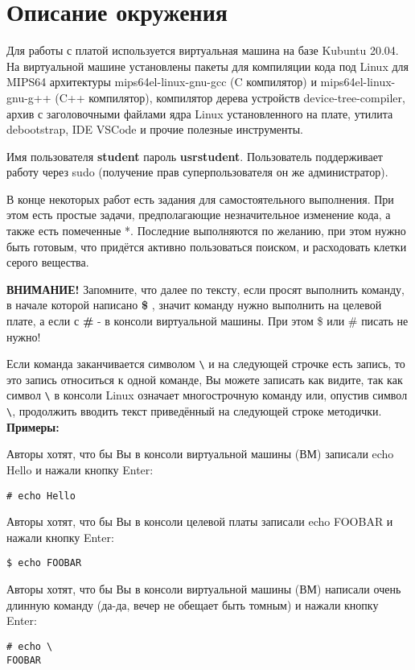 \section*{Описание окружения}
Для работы с платой используется виртуальная машина на базе Kubuntu 20.04. На виртуальной машине установлены пакеты для компиляции кода под Linux для MIPS64 архитектуры mips64el-linux-gnu-gcc (C компилятор) и mips64el-linux-gnu-g++ (C++ компилятор), компилятор дерева устройств device-tree-compiler, архив с заголовочными файлами ядра Linux установленного на плате, утилита debootstrap, IDE VSCode и прочие полезные инструменты. 

Имя пользователя \textbf{student} пароль \textbf{usrstudent}. Пользователь поддерживает работу через sudo (получение прав суперпользователя он же администратор).

В конце некоторых работ есть задания для самостоятельного выполнения. При этом есть простые задачи, предполагающие незначительное изменение кода, а также есть помеченные *. Последние выполняются по желанию, при этом нужно быть готовым, что придётся активно пользоваться поиском, и расходовать клетки серого вещества.

\textbf{ВНИМАНИЕ!} Запомните, что далее по тексту, если просят выполнить команду, в начале которой написано \textbf{\$} , значит команду нужно выполнить на целевой плате, а если с \textbf{\#} - в консоли виртуальной машины. При этом \$ или \# писать не нужно! 

Если команда заканчивается символом \verb!\! и на следующей строчке есть запись, то это запись относиться к одной команде, Вы можете записать как видите, так как символ \verb!\! в консоли Linux означает многострочную команду или, опустив символ \verb!\!, продолжить вводить текст приведённый на следующей строке методички.\\


\textbf{Примеры:}

Авторы хотят, что бы Вы в консоли виртуальной машины (ВМ) записали echo Hello и нажали кнопку Enter:

\begin{lstlisting}[style=bash]
# echo Hello 
\end{lstlisting}

Авторы хотят, что бы Вы в консоли целевой платы записали echo FOOBAR и нажали кнопку Enter:

\begin{lstlisting}[style=bash]
$ echo FOOBAR
\end{lstlisting}

Авторы хотят, что бы Вы в консоли виртуальной машины (ВМ) написали очень длинную команду (да-да, вечер не обещает быть томным) и нажали кнопку  Enter:

\begin{lstlisting}[style=bash]
# echo \
FOOBAR 
\end{lstlisting}